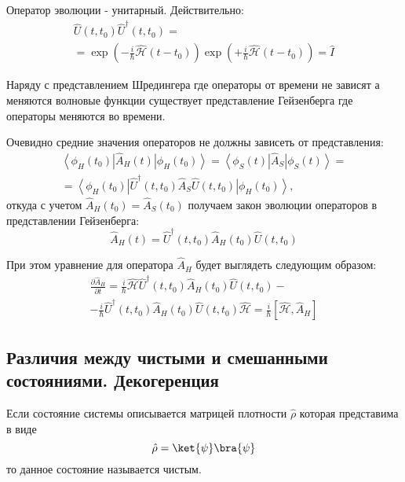 Оператор эволюции - унитарный. Действительно:
\begin{eqnarray}
\hat{U}\left(t,t_0\right)\hat{U}^\dag\left(t,t_0\right) = 
\nonumber \\
= \exp\left( -\frac{i}{\hbar} \hat{\mathcal{H}} \left( t - t_0 \right)
\right)
\exp\left( +\frac{i}{\hbar} \hat{\mathcal{H}} \left( t - t_0 \right)
\right)
= \hat{I}
\nonumber
\end{eqnarray}

Наряду с представлением Шредингера где операторы от времени не зависят
а меняются волновые функции существует представление Гейзенберга где
операторы меняются во времени.

Очевидно средние значения операторов не должны зависеть от
представления:
\begin{eqnarray}
\left< \phi_H\left(t_0\right) \right|\hat{A}_H\left(t\right)\left| 
\phi_H\left(t_0\right) \right> = 
\left< \phi_S\left(t\right) \right|\hat{A}_S\left| 
\phi_S\left(t\right) \right> = 
\nonumber \\
=
\left<
\phi_H\left(t_0\right)\right|\hat{U}^\dag\left(t,t_0\right)\hat{A}_S\hat{U}\left(t,t_0\right)\left|
\phi_H\left(t_0\right) \right>,
\nonumber
\end{eqnarray}
откуда с учетом $\hat{A}_H\left(t_0\right) = \hat{A}_S\left(t_0\right)$ получаем закон эволюции операторов в представлении Гейзенберга:
\begin{equation}
\hat{A}_H\left(t\right) = \hat{U}^\dag\left(t,t_0\right)\hat{A}_H\left(t_0\right)\hat{U}\left(t,t_0\right)
\label{eqAddWaveFunc_HeizenbergU}
\end{equation}

При этом уравнение для оператора $\hat{A}_H$ будет выглядеть следующим
образом:
\begin{eqnarray}
  \frac{\partial \hat{A}_H}{\partial t} =
  \frac{i}{\hbar} \hat{\mathcal{H}}
  \hat{U}^\dag\left(t,t_0\right)\hat{A}_H\left(t_0\right)\hat{U}\left(t,t_0\right)
  -
  \nonumber \\
  - \frac{i}{\hbar}
  \hat{U}^\dag\left(t,t_0\right)\hat{A}_H\left(t_0\right)\hat{U}\left(t,t_0\right)
  \hat{\mathcal{H}} =
  \frac{i}{\hbar} \left[\hat{\mathcal{H}}, \hat{A}_H \right]
  \label{eqAddWaveFunc_HeizenbergT}
\end{eqnarray}

\subsection{Различия между чистыми и смешанными
  состояниями. Декогеренция}
\begin{definition}
Если состояние системы описывается матрицей плотности $\hat{\rho}$
которая представима в виде 
\begin{equation}
\hat{\rho} = \ket{\psi}\bra{\psi}
\label{eq:add:quant:purestate}
\end{equation}
то данное состояние называется чистым.
\end{definition}

